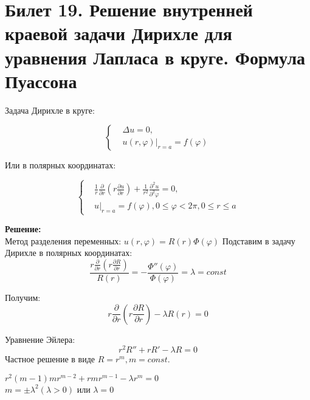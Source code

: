 \documentclass[11pt,a4paper]{article}
\begin{document}
    \section*{Билет 19. Решение внутренней краевой задачи Дирихле для уравнения Лапласа в круге. Формула Пуассона}
    
    \quad Задача Дирихле в круге:
    
    \[ \left\{\begin{aligned}
    & \Delta u=0, \\ & u(r,\varphi)|_{r=a}=f(\varphi)
    \end{aligned}\right. \]
    
    Или в полярных координатах:
    
    \[ \left\{\begin{aligned}
    & \frac{1}{r} \frac{\partial}{\partial r}\left (r\frac{\partial u}{\partial r}\right)+\frac{1}{r^2}\frac{\partial^2 u}{\partial^2 \varphi}=0, \\ & u|_{r=a}=f(\varphi), 0\leq \varphi<2\pi, 0\leq r\leq a
    \end{aligned}\right. \]
    
    
    \textbf{Решение:} \\
    Метод разделения переменных: $u(r,\varphi)=R(r)\Phi(\varphi)$
    Подставим в задачу Дирихле в полярных координатах:
    \begin{equation}\label{eq:5}
    \frac{r\frac{\partial }{\partial r}\left(r\frac{\partial R}{\partial r} 
    \right)}{R(r)}=-\frac{\Phi''(\varphi)}{\Phi(\varphi)}=\lambda=const
    \end{equation}
    
    Получим:
    \begin{equation}\label{eq:1}
    r\frac{\partial }{\partial r}\left(r\frac{\partial R}{\partial r} 
    \right)-\lambda R(r)=0
    \end{equation}
    
    Уравнение Эйлера:
    \begin{equation}
    r^2R''+rR'-\lambda R=0
    \end{equation}
    Частное решение в виде $R=r^m, m=const$.
    \begin{center}
    $r^2(m-1)mr^{m-2}+rmr^{m-1}-\lambda r^m=0$\\
    $m=\pm \lambda^2 (\lambda>0)$ или $\lambda=0$
    \end{center}
    
\end{document}
